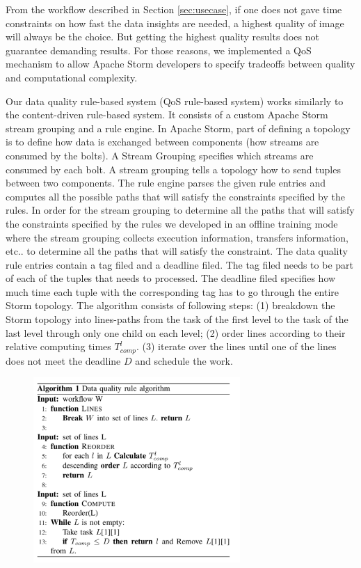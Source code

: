 From the workflow described in Section \ref{sec:usecase}, if one does not gave time constraints on how fast the data insights are needed, a highest quality of   image will always be the choice. But getting the highest quality results does not guarantee demanding results. For those reasons, we implemented a QoS mechanism to allow Apache Storm developers to specify tradeoffs between quality and computational complexity.

Our data quality rule-based system (QoS rule-based system) works similarly to the content-driven rule-based system. It consists of a custom Apache Storm stream grouping and a rule engine. In Apache Storm, part of defining a topology is to define how data is exchanged between components (how streams are consumed by the bolts). A Stream Grouping specifies which streams are consumed by each bolt. A stream grouping tells a topology how to send tuples between two components. The rule engine parses the given rule entries and computes all the possible paths that will satisfy the constraints specified by the rules. In order for the stream grouping to determine all the paths that will satisfy the constraints specified by the rules we developed in an offline training mode where the stream grouping collects execution information, transfers information, etc.. to determine all the paths that will satisfy the constraint. The data quality rule entries contain a tag filed and a deadline filed. The tag filed needs to be part of each of the tuples that needs to processed. The deadline filed specifies how much time each tuple with the corresponding tag has to go through the entire Storm topology. The algorithm consists of following steps: (1) breakdown the Storm topology into lines-paths from the task of the first level to the task of the last level through only one child on each level; (2) order lines according to their relative computing times $T_{comp}^l$. (3) iterate over the lines until one of the lines does not meet the deadline $D$ and schedule the work.

\begin{figure}[h!]
  \centering
  \includegraphics[width=0.7\textwidth]{Figures/Algorithm.pdf}
  \label{fig:Algorithm}
\end{figure}

